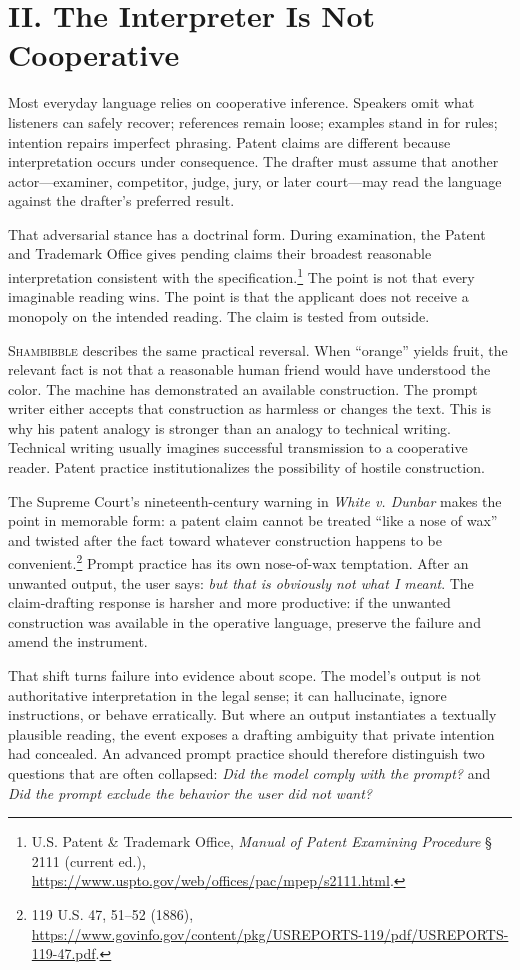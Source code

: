 \documentclass[11pt]{article}
\newcommand{\sham}{\textsc{Shambibble}\xspace}
\begin{document}
\section*{II. The Interpreter Is Not Cooperative}
Most everyday language relies on cooperative inference. Speakers omit what listeners can safely recover; references remain loose; examples stand in for rules; intention repairs imperfect phrasing. Patent claims are different because interpretation occurs under consequence. The drafter must assume that another actor---examiner, competitor, judge, jury, or later court---may read the language against the drafter's preferred result.

That adversarial stance has a doctrinal form. During examination, the Patent and Trademark Office gives pending claims their broadest reasonable interpretation consistent with the specification.\footnote{U.S. Patent \& Trademark Office, \emph{Manual of Patent Examining Procedure} § 2111 (current ed.), \url{https://www.uspto.gov/web/offices/pac/mpep/s2111.html}.} The point is not that every imaginable reading wins. The point is that the applicant does not receive a monopoly on the intended reading. The claim is tested from outside.

\sham describes the same practical reversal. When ``orange'' yields fruit, the relevant fact is not that a reasonable human friend would have understood the color. The machine has demonstrated an available construction. The prompt writer either accepts that construction as harmless or changes the text. This is why his patent analogy is stronger than an analogy to technical writing. Technical writing usually imagines successful transmission to a cooperative reader. Patent practice institutionalizes the possibility of hostile construction.

The Supreme Court's nineteenth-century warning in \emph{White v. Dunbar} makes the point in memorable form: a patent claim cannot be treated ``like a nose of wax'' and twisted after the fact toward whatever construction happens to be convenient.\footnote{119 U.S. 47, 51--52 (1886), \url{https://www.govinfo.gov/content/pkg/USREPORTS-119/pdf/USREPORTS-119-47.pdf}.} Prompt practice has its own nose-of-wax temptation. After an unwanted output, the user says: \emph{but that is obviously not what I meant}. The claim-drafting response is harsher and more productive: if the unwanted construction was available in the operative language, preserve the failure and amend the instrument.

That shift turns failure into evidence about scope. The model's output is not authoritative interpretation in the legal sense; it can hallucinate, ignore instructions, or behave erratically. But where an output instantiates a textually plausible reading, the event exposes a drafting ambiguity that private intention had concealed. An advanced prompt practice should therefore distinguish two questions that are often collapsed: \emph{Did the model comply with the prompt?} and \emph{Did the prompt exclude the behavior the user did not want?}
\end{document}
